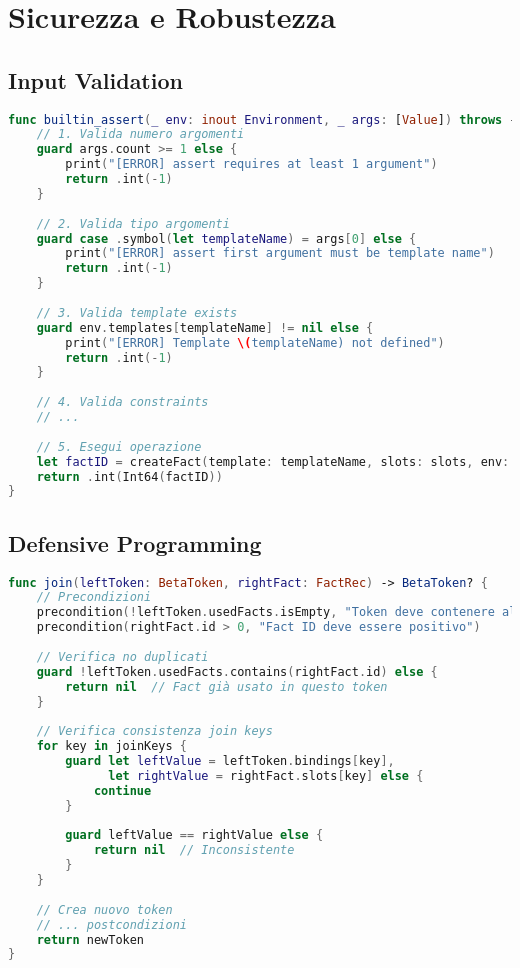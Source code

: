\section{Sicurezza e Robustezza}

\subsection{Input Validation}

\begin{lstlisting}[language=Swift]
func builtin_assert(_ env: inout Environment, _ args: [Value]) throws -> Value {
    // 1. Valida numero argomenti
    guard args.count >= 1 else {
        print("[ERROR] assert requires at least 1 argument")
        return .int(-1)
    }
    
    // 2. Valida tipo argomenti
    guard case .symbol(let templateName) = args[0] else {
        print("[ERROR] assert first argument must be template name")
        return .int(-1)
    }
    
    // 3. Valida template exists
    guard env.templates[templateName] != nil else {
        print("[ERROR] Template \(templateName) not defined")
        return .int(-1)
    }
    
    // 4. Valida constraints
    // ...
    
    // 5. Esegui operazione
    let factID = createFact(template: templateName, slots: slots, env: &env)
    return .int(Int64(factID))
}
\end{lstlisting}

\subsection{Defensive Programming}

\begin{lstlisting}[language=Swift]
func join(leftToken: BetaToken, rightFact: FactRec) -> BetaToken? {
    // Precondizioni
    precondition(!leftToken.usedFacts.isEmpty, "Token deve contenere almeno 1 fatto")
    precondition(rightFact.id > 0, "Fact ID deve essere positivo")
    
    // Verifica no duplicati
    guard !leftToken.usedFacts.contains(rightFact.id) else {
        return nil  // Fact già usato in questo token
    }
    
    // Verifica consistenza join keys
    for key in joinKeys {
        guard let leftValue = leftToken.bindings[key],
              let rightValue = rightFact.slots[key] else {
            continue
        }
        
        guard leftValue == rightValue else {
            return nil  // Inconsistente
        }
    }
    
    // Crea nuovo token
    // ... postcondizioni
    return newToken
}
\end{lstlisting}

